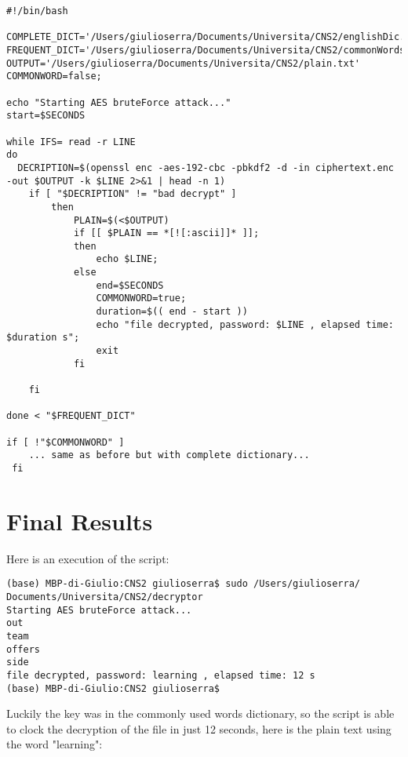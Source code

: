 \documentclass{article}
\begin{document}
\begin{verbatim}
#!/bin/bash

COMPLETE_DICT='/Users/giulioserra/Documents/Universita/CNS2/englishDic.txt'
FREQUENT_DICT='/Users/giulioserra/Documents/Universita/CNS2/commonWords.txt'
OUTPUT='/Users/giulioserra/Documents/Universita/CNS2/plain.txt'
COMMONWORD=false;

echo "Starting AES bruteForce attack..."
start=$SECONDS

while IFS= read -r LINE
do
  DECRIPTION=$(openssl enc -aes-192-cbc -pbkdf2 -d -in ciphertext.enc -out $OUTPUT -k $LINE 2>&1 | head -n 1)
    if [ "$DECRIPTION" != "bad decrypt" ]
        then
            PLAIN=$(<$OUTPUT)
            if [[ $PLAIN == *[![:ascii]]* ]]; 
            then
                echo $LINE;
            else
                end=$SECONDS
                COMMONWORD=true;
                duration=$(( end - start ))
                echo "file decrypted, password: $LINE , elapsed time: $duration s"; 
                exit
            fi

    fi

done < "$FREQUENT_DICT"

if [ !"$COMMONWORD" ]
	... same as before but with complete dictionary...
 fi
\end{verbatim}

\section{Final Results}
Here is an execution of the script:
\begin{verbatim}
(base) MBP-di-Giulio:CNS2 giulioserra$ sudo /Users/giulioserra/
Documents/Universita/CNS2/decryptor 
Starting AES bruteForce attack...
out
team
offers
side
file decrypted, password: learning , elapsed time: 12 s
(base) MBP-di-Giulio:CNS2 giulioserra$ 
\end{verbatim}

Luckily the key was in the commonly used words dictionary, so the script is able to clock the decryption of the file in just 12 seconds, here is the plain text using the word "learning":
\end{document}
